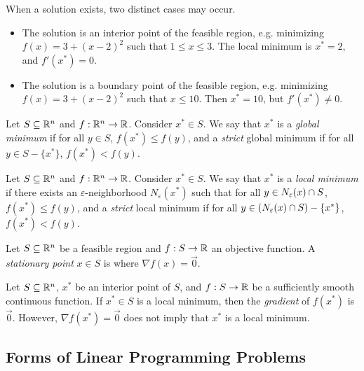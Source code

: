 \begin{exmp}
    When a solution exists, two distinct cases may occur.

    \begin{itemize}
        \item The solution is an interior point of the feasible region, e.g. minimizing $f(x) = 3 + (x - 2)^2$ such that $1 \leq x \leq 3$. The local minimum is $x^* = 2$, and $f'(x^*) = 0$.
        \item The solution is a boundary point of the feasible region, e.g. minimizing $f(x) = 3 + (x - 2)^2$ such that $x \leq 10$. Then $x^* = 10$, but $f'(x^*) \neq 0$.
    \end{itemize}
\end{exmp}

\begin{defn}
    Let $S \subseteq \mathbb{R}^n$ and $f: \mathbb{R}^n \to \mathbb{R}$. Consider $x^* \in S$. We say that $x^*$ is a \emph{global minimum} if for all $y \in S$, $f(x^*) \leq f(y)$, and a \emph{strict} global minimum if for all $y \in S - \{x^*\}$, $f(x^*) < f(y)$.
\end{defn}

\begin{defn}
    Let $S \subseteq \mathbb{R}^n$ and $f: \mathbb{R}^n \to \mathbb{R}$. Consider $x^* \in S$. We say that $x^*$ is a \emph{local minimum} if there exists an $\varepsilon$-neighborhood $N_{\varepsilon}(x^*)$ such that for all $y \in N_{\varepsilon}(x) \cap S$, $f(x^*) \leq f(y)$, and a \emph{strict} local minimum if for all $y \in \left(N_{\varepsilon}(x) \cap S\right) - \{x^*\}$, $f(x^*) < f(y)$.
\end{defn}

\begin{defn}
    Let $S \subseteq \mathbb{R}^n$ be a feasible region and $f: S \to \mathbb{R}$ an objective function. A \emph{stationary point} $x \in S$ is where $\nabla f(x) = \vec{0}.$
\end{defn}

\begin{rmk}
    Let $S \subseteq \mathbb{R}^n$, $x^*$ be an interior point of $S$, and $f: S \to \mathbb{R}$ be a sufficiently smooth continuous function. If $x^* \in S$ is a local minimum, then the \emph{gradient} of $f(x^*)$ is $\vec{0}$. However, $\nabla f(x^*) = \vec{0}$ does not imply that $x^*$ is a local minimum.
\end{rmk}

\subsection{Forms of Linear Programming Problems}

